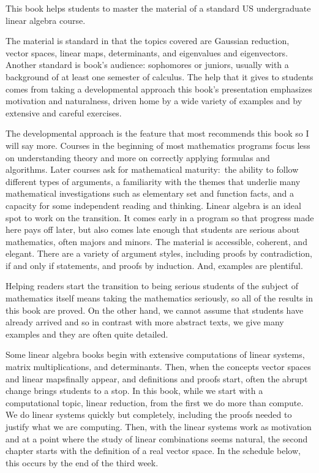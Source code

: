 %
%
%
\thispagestyle{plain}
%
\bigskip
\vspace*{1in}
\bigskip
\par\noindent
This book helps students to master the material of a standard 
US undergraduate linear algebra course.

The material is standard in that the topics covered are
Gaussian reduction, 
vector spaces, linear maps,
determinants, and eigenvalues and eigenvectors.
Another standard is book's audience:
sophomores or juniors, usually with a background 
of at least one semester of calculus. 
The help that it gives to students comes from taking a developmental 
approach\Dash 
this book's presentation emphasizes motivation and naturalness, 
driven home by a wide variety of
examples and by extensive and careful exercises.

The developmental approach is the feature that most recommends this book 
so I will say more.
Courses in the beginning of most mathematics programs
focus less on understanding theory and more on correctly
applying formulas and algorithms.
Later courses
ask for mathematical maturity:~the ability to follow different 
types of arguments, 
a familiarity with
the themes that underlie many mathematical investigations such as
elementary set and function facts,
and a capacity for some independent reading and thinking. 
Linear algebra is an ideal spot to work on the transition.
It comes early in a program so that progress made here pays off later,
but also comes late enough that
students are serious about mathematics, often majors and minors.
The material is accessible, coherent, and elegant.
There are a variety of argument styles, including proofs by
contradiction, if and only if statements, and proofs by induction.
And, examples are plentiful.

Helping readers start the transition to being serious students of 
the subject of mathematics itself
means taking the mathematics seriously, so
all of the results in this book are proved.
On the other hand, we cannot
assume that students have already arrived
and so 
in contrast with more abstract texts, 
we give many examples
and they are often quite detailed.

Some linear algebra books
begin with extensive computations of linear systems, 
matrix multiplications, 
and determinants.
Then, when the concepts\Dash 
vector spaces and linear maps\Dash finally appear, 
and definitions and proofs start, often the abrupt change
brings students to a stop.
In this book, while we start with
a computational topic, linear reduction, from the first
we do more than compute.
We do linear systems quickly but completely,
including the proofs needed to justify what we are computing.
Then, with the linear systems work as motivation
and at a point where the study of linear combinations seems natural,
the second chapter starts with the definition of a real vector space.
In the schedule below, this occurs by the end of the third week.


